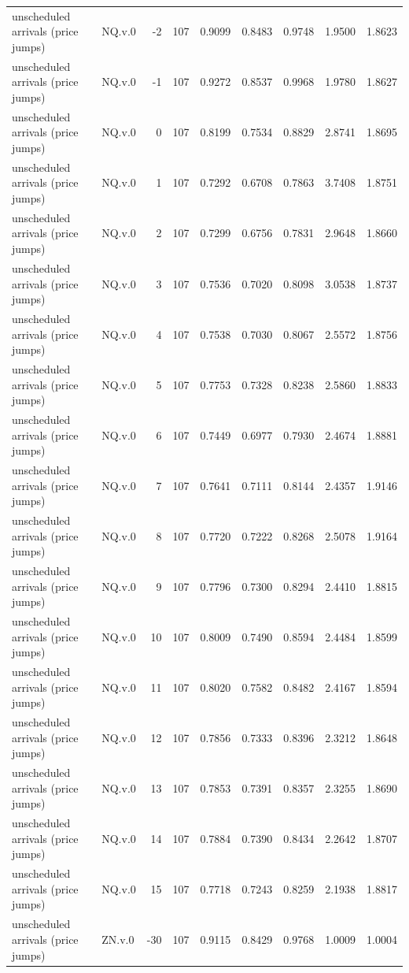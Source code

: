 \begin{tabular}{llrrrrrrr}
unscheduled arrivals (price jumps) & NQ.v.0 & -2 & 107 & 0.9099 & 0.8483 & 0.9748 & 1.9500 & 1.8623 \\
unscheduled arrivals (price jumps) & NQ.v.0 & -1 & 107 & 0.9272 & 0.8537 & 0.9968 & 1.9780 & 1.8627 \\
unscheduled arrivals (price jumps) & NQ.v.0 & 0 & 107 & 0.8199 & 0.7534 & 0.8829 & 2.8741 & 1.8695 \\
unscheduled arrivals (price jumps) & NQ.v.0 & 1 & 107 & 0.7292 & 0.6708 & 0.7863 & 3.7408 & 1.8751 \\
unscheduled arrivals (price jumps) & NQ.v.0 & 2 & 107 & 0.7299 & 0.6756 & 0.7831 & 2.9648 & 1.8660 \\
unscheduled arrivals (price jumps) & NQ.v.0 & 3 & 107 & 0.7536 & 0.7020 & 0.8098 & 3.0538 & 1.8737 \\
unscheduled arrivals (price jumps) & NQ.v.0 & 4 & 107 & 0.7538 & 0.7030 & 0.8067 & 2.5572 & 1.8756 \\
unscheduled arrivals (price jumps) & NQ.v.0 & 5 & 107 & 0.7753 & 0.7328 & 0.8238 & 2.5860 & 1.8833 \\
unscheduled arrivals (price jumps) & NQ.v.0 & 6 & 107 & 0.7449 & 0.6977 & 0.7930 & 2.4674 & 1.8881 \\
unscheduled arrivals (price jumps) & NQ.v.0 & 7 & 107 & 0.7641 & 0.7111 & 0.8144 & 2.4357 & 1.9146 \\
unscheduled arrivals (price jumps) & NQ.v.0 & 8 & 107 & 0.7720 & 0.7222 & 0.8268 & 2.5078 & 1.9164 \\
unscheduled arrivals (price jumps) & NQ.v.0 & 9 & 107 & 0.7796 & 0.7300 & 0.8294 & 2.4410 & 1.8815 \\
unscheduled arrivals (price jumps) & NQ.v.0 & 10 & 107 & 0.8009 & 0.7490 & 0.8594 & 2.4484 & 1.8599 \\
unscheduled arrivals (price jumps) & NQ.v.0 & 11 & 107 & 0.8020 & 0.7582 & 0.8482 & 2.4167 & 1.8594 \\
unscheduled arrivals (price jumps) & NQ.v.0 & 12 & 107 & 0.7856 & 0.7333 & 0.8396 & 2.3212 & 1.8648 \\
unscheduled arrivals (price jumps) & NQ.v.0 & 13 & 107 & 0.7853 & 0.7391 & 0.8357 & 2.3255 & 1.8690 \\
unscheduled arrivals (price jumps) & NQ.v.0 & 14 & 107 & 0.7884 & 0.7390 & 0.8434 & 2.2642 & 1.8707 \\
unscheduled arrivals (price jumps) & NQ.v.0 & 15 & 107 & 0.7718 & 0.7243 & 0.8259 & 2.1938 & 1.8817 \\
unscheduled arrivals (price jumps) & ZN.v.0 & -30 & 107 & 0.9115 & 0.8429 & 0.9768 & 1.0009 & 1.0004 \\

\end{tabular}

